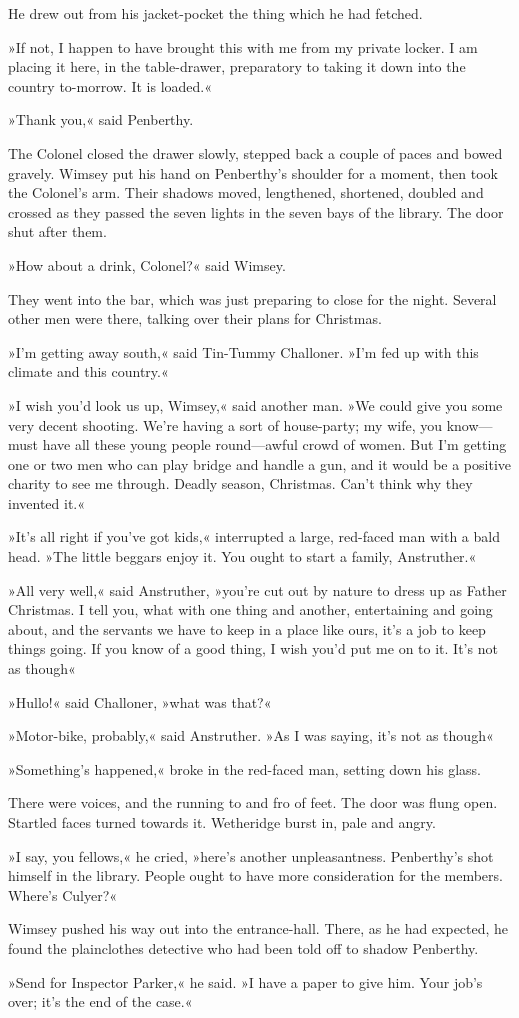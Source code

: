 He drew out from his jacket-pocket the thing which he had fetched.

»If not, I happen to have brought this with me from my private locker. I am placing it here, in the table-drawer, preparatory to taking it down into the country to-morrow. It is loaded.«

»Thank you,« said Penberthy.

The Colonel closed the drawer slowly, stepped back a couple of paces and bowed gravely. Wimsey put his hand on Penberthy's shoulder for a moment, then took the Colonel's arm. Their shadows moved, lengthened, shortened, doubled and crossed as they passed the seven lights in the seven bays of the library. The door shut after them.

»How about a drink, Colonel?« said Wimsey.

They went into the bar, which was just preparing to close for the night. Several other men were there, talking over their plans for Christmas.

»I'm getting away south,« said Tin-Tummy Challoner. »I'm fed up with this climate and this country.«

»I wish you'd look us up, Wimsey,« said another man. »We could give you some very decent shooting. We're having a sort of house-party; my wife, you know\allowbreak---\allowbreak must have all these young people round\allowbreak---\allowbreak awful crowd of women. But I'm getting one or two men who can play bridge and handle a gun, and it would be a positive charity to see me through. Deadly season, Christmas. Can't think why they invented it.«

»It's all right if you've got kids,« interrupted a large, red-faced man with a bald head. »The little beggars enjoy it. You ought to start a family, Anstruther.«

»All very well,« said Anstruther, »you're cut out by nature to dress up as Father Christmas. I tell you, what with one thing and another, entertaining and going about, and the servants we have to keep in a place like ours, it's a job to keep things going. If you know of a good thing, I wish you'd put me on to it. It's not as though\longdash«

»Hullo!« said Challoner, »what was that?«

»Motor-bike, probably,« said Anstruther. »As I was saying, it's not as though\longdash«

»Something's happened,« broke in the red-faced man, setting down his glass.

There were voices, and the running to and fro of feet. The door was flung open. Startled faces turned towards it. Wetheridge burst in, pale and angry.

»I say, you fellows,« he cried, »here's another unpleasantness. Penberthy's shot himself in the library. People ought to have more consideration for the members. Where's Culyer?«

Wimsey pushed his way out into the entrance-hall. There, as he had expected, he found the plainclothes detective who had been told off to shadow Penberthy.

»Send for Inspector Parker,« he said. »I have a paper to give him. Your job's over; it's the end of the case.«